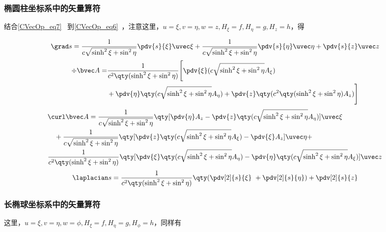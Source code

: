 \subsubsection{椭圆柱坐标系中的矢量算符}
结合\autoref{CVecOp_eq7}~ 到\autoref{CVecOp_eq6}~，注意这里，$u=\xi,v=\eta,w=z,H_\xi=f,H_\eta=g,H_z=h$，得

\begin{equation}
\grad s = \frac{1}{c\sqrt{\sinh^2\xi+\sin^2\eta}} \pdv{s}{\xi}\uvec \xi + \frac{1}{c\sqrt{\sinh^2\xi+\sin^2\eta}}\pdv{s}{\eta} \uvec \eta +  \pdv{s}{z}\uvec z
\end{equation}
\begin{equation}
\begin{aligned}
\div \bvec A = &\frac{1}{c^2\qty(\sinh^2\xi+\sin^2\eta)}\Bigg[\pdv{\xi}(c\sqrt{\sinh^2\xi+\sin^2\eta}A_\xi) \\&+ \pdv{\eta}\qty(c\sqrt{\sinh^2\xi+\sin^2\eta}A_\eta) + \pdv{z}\qty(c^2\qty(\sinh^2\xi+\sin^2\eta)A_z)\Bigg]
\end{aligned}
\end{equation}
\begin{equation}
\begin{aligned}
&\curl \bvec A = \frac{1}{c\sqrt{\sinh^2\xi+\sin^2\eta}}\qty[\pdv{\eta}A_z - \pdv{z}\qty(c\sqrt{\sinh^2\xi+\sin^2\eta}A_\eta)]\uvec \xi\\
&\quad + \frac{1}{c\sqrt{\sinh^2\xi+\sin^2\eta}}\qty[\pdv{z}\qty(c\sqrt{\sinh^2\xi+\sin^2\eta}A_\xi) - \pdv{\xi}A_z]\uvec \eta
+ \\
&\frac{1}{c^2\qty(\sinh^2\xi+\sin^2\eta)}\qty[\pdv{\xi}\qty(c\sqrt{\sinh^2\xi+\sin^2\eta}A_\eta) - \pdv{\eta}\qty(c\sqrt{\sinh^2\xi+\sin^2\eta}A_\xi)]\uvec z
\end{aligned}
\end{equation}
\begin{equation}
\laplacian s = \frac{1}{c^2\qty(\sinh^2\xi+\sin^2\eta)}\qty(\pdv[2]{s}{\xi}\ + \pdv[2]{s}{\eta} )+ \pdv[2]{s}{z}
\end{equation}

\subsubsection{长椭球坐标系中的矢量算符}
这里，$u=\xi,v=\eta,w=\phi,H_\xi=f,H_\eta=g,H_\phi=h$，同样有

